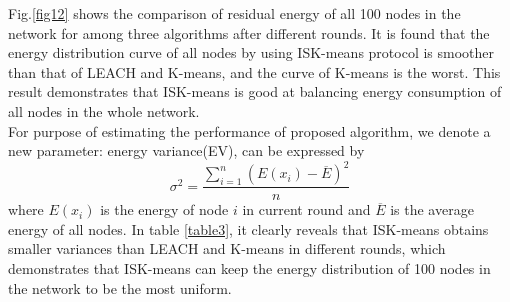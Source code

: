\documentclass[11pt]{report}
\begin{document}
	Fig.\ref{fig12} shows the comparison of residual energy of all 100 nodes in the network for among three algorithms after different rounds.  It is found that the energy distribution curve of all nodes by using ISK-means protocol is smoother than that of LEACH and K-means, and the curve of K-means is the worst. This result demonstrates that ISK-means is good at balancing energy consumption of all nodes in the whole network. \\
	For purpose of estimating the performance of proposed algorithm, we denote a new parameter: energy variance(EV), can be expressed by
	\begin{equation}
	\sigma^2 = \frac{\sum_{i=1}^{n}\left(E\left(x_i\right) - \overline{E}\right)^2}{n}
	\end{equation}
	where $E\left(x_i\right)$ is the energy of node $i$ in current round and $\overline{E}$ is the average energy of all nodes. In table \ref{table3}, it clearly reveals that ISK-means obtains smaller variances than LEACH and K-means in different rounds, which demonstrates that ISK-means can keep the energy distribution of 100 nodes in the network to be the most uniform.
	
\end{document}
